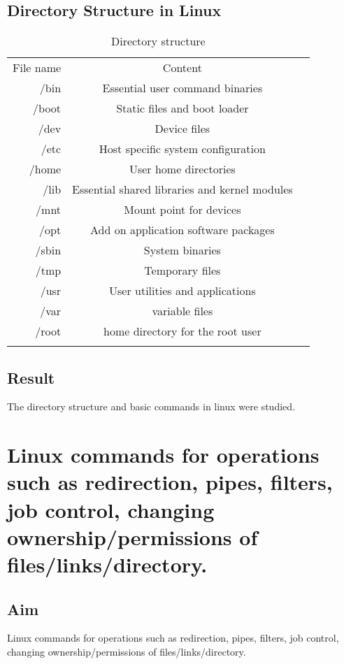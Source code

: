 \documentclass{article}
\begin{document}
\subsection{Directory Structure in Linux}
\begin{table}[htb]
\caption{Directory structure}
\label{Directory Structure in Linux}
\begin{tabular}{rcc}
\noalign{\smallskip} \hline \hline \noalign{\smallskip}
File name & Content\\
/bin & Essential user command binaries\\
/boot & Static files and boot loader\\
/dev & Device files\\
/etc & Host specific system configuration\\
/home & User home directories\\
/lib & Essential shared libraries and kernel modules\\
/mnt & Mount point for devices\\
/opt & Add on application software packages\\
/sbin & System binaries\\
/tmp & Temporary files\\
/usr & User utilities and applications\\
/var &variable files\\
/root & home directory for the root user\\ 
\hline
\noalign{\smallskip} \hline \noalign{\smallskip}
\end{tabular}
\end{table}

\subsection{Result}
The directory structure and basic commands in linux were studied.
\newpage
\section{Linux commands for operations such as redirection, pipes, filters, job control, changing ownership/permissions of files/links/directory.}

\subsection{Aim}
Linux commands for operations such as redirection, pipes, filters, job control, changing ownership/permissions of files/links/directory.
\end{document}
